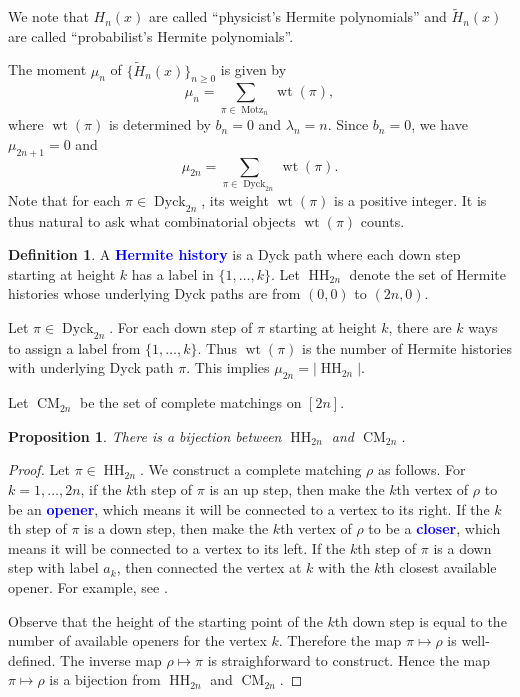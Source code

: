 \documentclass[oneside]{book}
\numberwithin{equation}{section}
\newtheorem{prop}[thm]{Proposition}
\theoremstyle{definition}
\newtheorem{defn}[thm]{Definition}
\newcommand\CM{\operatorname{CM}}
\newcommand\HH{\operatorname{HH}}
\newcommand\Motz{\operatorname{Motz}}
\newcommand{\Dyck}{\operatorname{Dyck}}
\newcommand\wt{\operatorname{wt}}
\renewcommand\emph[1]{\textcolor{blue}{\bf #1}}
\begin{document}
We note that \( H_n(x) \) are called ``physicist's Hermite
polynomials'' and \( \widetilde{H}_n(x) \) are called ``probabilist's
Hermite polynomials''.

The moment \( \mu_n \) of \( \{ \widetilde{H}_n(x) \}_{n\ge 0} \) 
is given by
\[
  \mu_n = \sum_{\pi\in\Motz_n} \wt(\pi),
\]
where \( \wt(\pi) \) is determined by \( b_n=0 \) and
\( \lambda_n=n \). Since \( b_n=0 \),
we have \( \mu_{2n+1}=0 \) and
\[
  \mu_{2n} = \sum_{\pi\in\Dyck_{2n}} \wt(\pi).
\]
Note that for each \( \pi\in\Dyck_{2n} \), its weight \( \wt(\pi) \)
is a positive integer. It is thus natural to ask what combinatorial
objects \( \wt(\pi) \) counts.

\begin{defn}
  A \emph{Hermite history} is a Dyck path where each down step
  starting at height \( k \) has a label in \( \{1,\dots,k\} \).
  Let \( \HH_{2n} \) denote the set of Hermite histories whose
  underlying Dyck paths are from \( (0,0) \) to \( (2n,0) \).
\end{defn}

Let \( \pi\in\Dyck_{2n} \). For each down step of \( \pi \) starting
at height \( k \), there are \( k \) ways to assign a label from
\( \{1,\dots,k\} \). Thus \( \wt(\pi) \) is the number of Hermite
histories with underlying Dyck path \( \pi \). This implies
\( \mu_{2n} = |\HH_{2n}|  \).

Let \( \CM_{2n} \) be the set of complete matchings on \( [2n] \).

\begin{prop}
  There is a bijection between \( \HH_{2n} \) and \( \CM_{2n} \).
\end{prop}

\begin{proof}
  Let \( \pi\in \HH_{2n} \). We construct a complete matching
  \( \rho \) as follows. For \( k= 1,\dots,2n \), if the \( k \)th
  step of \( \pi \) is an up step, then make the \( k \)th vertex of
  \( \rho \) to be an \emph{opener}, which means it will be connected
  to a vertex to its right. If the \( k \)th step of \( \pi \) is a
  down step, then make the \( k \)th vertex of \( \rho \) to be a
  \emph{closer}, which means it will be connected to a vertex to its
  left. If the \( k \)th step of \( \pi \) is a down step with label
  \( a_k \), then connected the vertex at \( k \) with the \( k \)th
  closest available opener. For example, see
  .

  Observe that the height of the starting point of the \( k \)th down
  step is equal to the number of available openers for the vertex
  \( k \). Therefore the map \( \pi\mapsto \rho \) is well-defined.
  The inverse map \( \rho\mapsto \pi \) is straighforward to
  construct. Hence the map \( \pi\mapsto \rho \) is a bijection from
  \( \HH_{2n} \) and \( \CM_{2n} \).
\end{proof}
\end{document}
